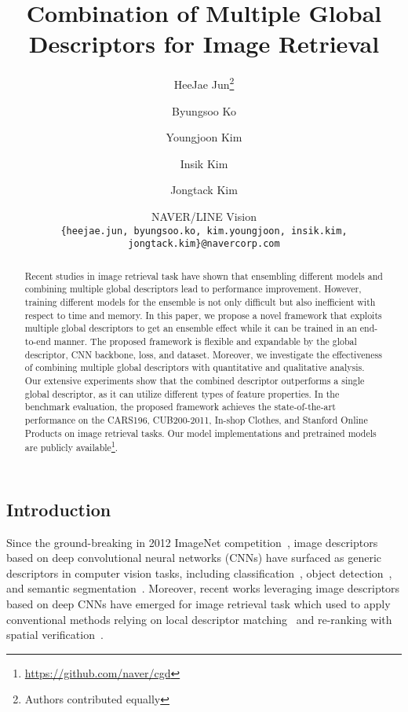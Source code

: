 \documentclass[10pt,twocolumn,letterpaper]{article}
\begin{document}
\begin{CJK}{UTF8}{mj}

\title{Combination of Multiple Global Descriptors for Image Retrieval}

\author{HeeJae Jun\thanks{Authors contributed equally}
\and
Byungsoo Ko\footnotemark[1]\\
\and
Youngjoon Kim\\
\and
Insik Kim\\
\and
Jongtack Kim\\
\and
NAVER/LINE Vision\\
{\tt\small \{heejae.jun, byungsoo.ko, kim.youngjoon, insik.kim, jongtack.kim\}@navercorp.com}
}

\maketitle
\ifwacvfinal\thispagestyle{empty}\fi

\begin{abstract}
Recent studies in image retrieval task have shown that ensembling different models and combining multiple global descriptors lead to performance improvement.
However, training different models for the ensemble is not only difficult but also inefficient with respect to time and memory.
In this paper, we propose a novel framework that exploits multiple global descriptors to get an ensemble effect while it can be trained in an end-to-end manner.
The proposed framework is flexible and expandable by the global descriptor, CNN backbone, loss, and dataset.
Moreover, we investigate the effectiveness of combining multiple global descriptors with quantitative and qualitative analysis.
Our extensive experiments show that the combined descriptor outperforms a single global descriptor, as it can utilize different types of feature properties.
In the benchmark evaluation, the proposed framework achieves the state-of-the-art performance on the CARS196, CUB200-2011, In-shop Clothes, and Stanford Online Products on image retrieval tasks.
Our model implementations and pretrained models are publicly available\footnote{\url{https://github.com/naver/cgd}}.
\end{abstract}

\section{Introduction}
Since the ground-breaking in 2012 ImageNet competition~\cite{deng2009imagenet, krizhevsky2012imagenet}, image descriptors based on deep convolutional neural networks (CNNs) have surfaced as generic descriptors in computer vision tasks, including classification~\cite{krizhevsky2012imagenet, he2016deep, szegedy2016rethinking}, object detection~\cite{girshick2015fast, ren2015faster, redmon2016you}, and semantic segmentation~\cite{long2015fully, chen2018deeplab, ronneberger2015u}.
Moreover, recent works leveraging image descriptors based on deep CNNs have emerged for image retrieval task which used to apply conventional methods relying on local descriptor matching~\cite{lowe2004distinctive, ke2004pca} and re-ranking with spatial verification~\cite{mikulik2010learning, tolias2016image, li2015pairwise}.


\end{CJK}
\end{document}
